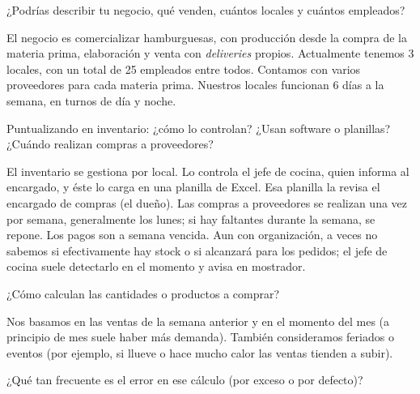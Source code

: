 \begin{description}[leftmargin=0cm, labelsep=0.5cm]

  \item[\textbf{Entrevistador:}] ¿Podrías describir tu negocio, qué venden, cuántos locales y cuántos empleados?

  \item[\textbf{Ulises Litterio:}] El negocio es comercializar hamburguesas, con producción desde la compra de la materia prima, elaboración y venta con \textit{deliveries} propios. Actualmente tenemos 3 locales, con un total de 25 empleados entre todos. Contamos con varios proveedores para cada materia prima. Nuestros locales funcionan 6 días a la semana, en turnos de día y noche.

  \item[\textbf{Entrevistador:}] Puntualizando en inventario: ¿cómo lo controlan? ¿Usan software o planillas? ¿Cuándo realizan compras a proveedores?

  \item[\textbf{Ulises Litterio:}] El inventario se gestiona por local. Lo controla el jefe de cocina, quien informa al encargado, y éste lo carga en una planilla de Excel. Esa planilla la revisa el encargado de compras (el dueño). Las compras a proveedores se realizan una vez por semana, generalmente los lunes; si hay faltantes durante la semana, se repone. Los pagos son a semana vencida. Aun con organización, a veces no sabemos si efectivamente hay stock o si alcanzará para los pedidos; el jefe de cocina suele detectarlo en el momento y avisa en mostrador.

  \item[\textbf{Entrevistador:}] ¿Cómo calculan las cantidades o productos a comprar?

  \item[\textbf{Ulises Litterio:}] Nos basamos en las ventas de la semana anterior y en el momento del mes (a principio de mes suele haber más demanda). También consideramos feriados o eventos (por ejemplo, si llueve o hace mucho calor las ventas tienden a subir).

  \item[\textbf{Entrevistador:}] ¿Qué tan frecuente es el error en ese cálculo (por exceso o por defecto)?


\end{description}
